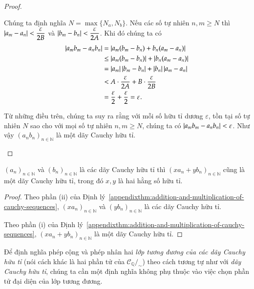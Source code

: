 \begin{proof}
\begin{enumerate}[label={(\roman*)}]
              Chúng ta định nghĩa $N = \max\{ N_{a}, N_{b}\}$. Nếu các số tự nhiên $n, m\geq N$ thì $\left\vert{a_{m} - a_{n}}\right\vert < \dfrac{\varepsilon}{2B}$ và $\left\vert{b_{m} - b_{n}}\right\vert < \dfrac{\varepsilon}{2A}$. Khi đó chúng ta có
              \begin{align*}
                  \left\vert{a_{m}b_{m} - a_{n}b_{n}}\right\vert & = \left\vert{a_{m}(b_{m} - b_{n}) + b_{n}(a_{m} - a_{n})}\right\vert               \\
                                                & \leq \left\vert{a_{m}(b_{m} - b_{n})}\right\vert + \left\vert{b_{n}(a_{m} - a_{n})}\right\vert      \\
                                                & = \left\vert{a_{m}}\right\vert\left\vert{b_{m} - b_{n}}\right\vert + \left\vert{b_{n}}\right\vert\left\vert{a_{m} - a_{n}}\right\vert \\
                                                & < A\cdot \frac{\varepsilon}{2A} + B\cdot\frac{\varepsilon}{2B}    \\
                                                & = \frac{\varepsilon}{2} + \frac{\varepsilon}{2} = \varepsilon.
              \end{align*}

              Từ những điều trên, chúng ta suy ra rằng với mỗi số hữu tỉ dương $\varepsilon$, tồn tại số tự nhiên $N$ sao cho với mọi số tự nhiên $n, m\geq N$, chúng ta có $\left\vert{a_{m}b_{m} - a_{n}b_{n}}\right\vert < \varepsilon$. Như vậy ${(a_{n}b_{n})}_{n\in\mathbb{N}}$ là một dãy Cauchy hữu tỉ.
    \end{enumerate}
\end{proof}

\begin{corollary}\label{corollary:linear-combination-of-cauchy-sequences}
    ${(a_{n})}_{n\in\mathbb{N}}$ và ${(b_{n})}_{n\in\mathbb{N}}$ là các dãy Cauchy hữu tỉ thì ${(xa_{n} + yb_{n})}_{n\in\mathbb{N}}$ cũng là một dãy Cauchy hữu tỉ, trong đó $x, y$ là hai hằng số hữu tỉ.
\end{corollary}

\begin{proof}
    Theo phần (ii) của Định lý~\ref{appendixthm:addition-and-multiplication-of-cauchy-sequences}, ${(xa_{n})}_{n\in\mathbb{N}}$ và ${(yb_{n})}_{n\in\mathbb{N}}$ là các dãy Cauchy hữu tỉ.

    Theo phần (i) của Định lý~\ref{appendixthm:addition-and-multiplication-of-cauchy-sequences}, ${(xa_{n} + yb_{n})}_{n\in\mathbb{N}}$ là một dãy Cauchy hữu tỉ.
\end{proof}

Để định nghĩa phép cộng và phép nhân hai \textit{lớp tương đương của các dãy Cauchy hữu tỉ} (nói cách khác là hai phần tử của $\mathscr{C}_{\mathbb{Q}}/_{\sim}$) theo cách tương tự như với \textit{dãy Cauchy hữu tỉ}, chúng ta cần một định nghĩa không phụ thuộc vào việc chọn phần tử đại diện của lớp tương đương.

